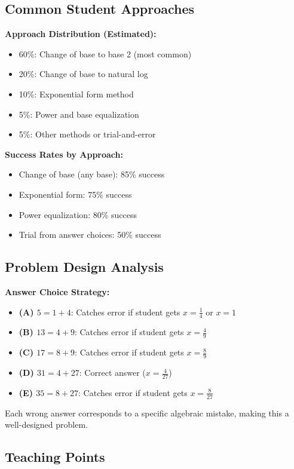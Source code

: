 \documentclass[12pt]{article}
\begin{document}
\begin{competitionbox}
\subsection*{Common Student Approaches}

\textbf{Approach Distribution (Estimated):}
\begin{itemize}
    \item 60\%: Change of base to base 2 (most common)
    \item 20\%: Change of base to natural log
    \item 10\%: Exponential form method
    \item 5\%: Power and base equalization
    \item 5\%: Other methods or trial-and-error
\end{itemize}

\textbf{Success Rates by Approach:}
\begin{itemize}
    \item Change of base (any base): 85\% success
    \item Exponential form: 75\% success
    \item Power equalization: 80\% success
    \item Trial from answer choices: 50\% success
\end{itemize}

\subsection*{Problem Design Analysis}

\textbf{Answer Choice Strategy:}
\begin{itemize}
    \item \textbf{(A) $5 = 1+4$}: Catches error if student gets $x = \frac{1}{4}$ or $x = 1$
    \item \textbf{(B) $13 = 4+9$}: Catches error if student gets $x = \frac{4}{9}$
    \item \textbf{(C) $17 = 8+9$}: Catches error if student gets $x = \frac{8}{9}$
    \item \textbf{(D) $31 = 4+27$}: Correct answer ($x = \frac{4}{27}$)
    \item \textbf{(E) $35 = 8+27$}: Catches error if student gets $x = \frac{8}{27}$
\end{itemize}

Each wrong answer corresponds to a specific algebraic mistake, making this a well-designed problem.

\subsection*{Teaching Points}


\end{competitionbox}
\end{document}
